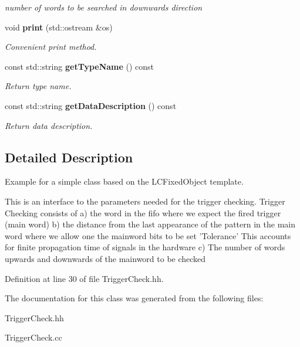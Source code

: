 \begin{DoxyCompactItemize}
\begin{DoxyCompactList}\small\item\em number of words to be searched in downwards direction \end{DoxyCompactList}\item 
void {\bf print} (std\-::ostream \&os)\label{classCALICE_1_1TriggerCheck_a2a2fd0d5f304e7d5c0ba892617bd84a1}

\begin{DoxyCompactList}\small\item\em Convenient print method. \end{DoxyCompactList}\item 
const std\-::string {\bf get\-Type\-Name} () const \label{classCALICE_1_1TriggerCheck_aaf8cece5cd4817d233e328c941c09563}

\begin{DoxyCompactList}\small\item\em Return type name. \end{DoxyCompactList}\item 
const std\-::string {\bf get\-Data\-Description} () const \label{classCALICE_1_1TriggerCheck_a29fbc7d9375224b05332c577ef3279a5}

\begin{DoxyCompactList}\small\item\em Return data description. \end{DoxyCompactList}\end{DoxyCompactItemize}


\subsection{Detailed Description}
Example for a simple class based on the L\-C\-Fixed\-Object template. 

This is an interface to the parameters needed for the trigger checking. Trigger Checking consists of a) the word in the fifo where we expect the fired trigger (main word) b) the distance from the last appearance of the pattern in the main word where we allow one the mainword bits to be set 'Tolerance' This accounts for finite propagation time of signals in the hardware c) The number of words upwards and downwards of the mainword to be checked 

Definition at line 30 of file Trigger\-Check.\-hh.



The documentation for this class was generated from the following files\-:\begin{DoxyCompactItemize}
\item 
Trigger\-Check.\-hh\item 
Trigger\-Check.\-cc\end{DoxyCompactItemize}
